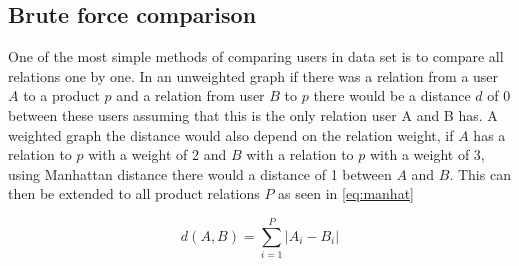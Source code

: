 \subsection{Brute force comparison}
One of the most simple methods of comparing users in data set is to compare all relations one by one. 
In an unweighted graph if there was a relation from a user $A$ to a product $p$ and a relation from user $B$ to $p$ there would be a distance $d$ of 0 between these users assuming that this is the only relation user A and B has. 
A weighted graph the distance would also depend on the relation weight, if $A$ has a relation to $p$ with a weight of 2 and $B$ with a relation to $p$ with a weight of 3, using Manhattan distance there would a distance of 1 between $A$ and $B$. 
This can then be extended to all product relations $P$ as seen in \autoref{eq:manhat}

\begin{equation}\label{eq:manhat}
	d(A,B) = \sum_{i=1}^{P} |A_i - B_i|
\end{equation}
